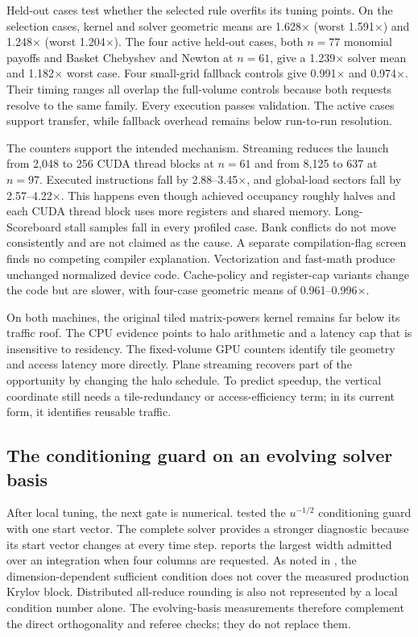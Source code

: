 Held-out cases test whether the selected rule overfits its tuning points. On the selection cases, kernel and solver geometric means are 1.628$\times$ (worst 1.591$\times$) and 1.248$\times$ (worst 1.204$\times$). The four active held-out cases, both $n=77$ monomial payoffs and Basket Chebyshev and Newton at $n=61$, give a 1.239$\times$ solver mean and 1.182$\times$ worst case. Four small-grid fallback controls give 0.991$\times$ and 0.974$\times$. Their timing ranges all overlap the full-volume controls because both requests resolve to the same family. Every execution passes validation. The active cases support transfer, while fallback overhead remains below run-to-run resolution.

The counters support the intended mechanism. Streaming reduces the launch from 2{,}048 to 256 CUDA thread blocks at $n=61$ and from 8{,}125 to 637 at $n=97$. Executed instructions fall by 2.88--3.45$\times$, and global-load sectors fall by 2.57--4.22$\times$. This happens even though achieved occupancy roughly halves and each CUDA thread block uses more registers and shared memory. Long-Scoreboard stall samples fall in every profiled case. Bank conflicts do not move consistently and are not claimed as the cause. A separate compilation-flag screen finds no competing compiler explanation. Vectorization and fast-math produce unchanged normalized device code. Cache-policy and register-cap variants change the code but are slower, with four-case geometric means of 0.961--0.996$\times$.

On both machines, the original tiled matrix-powers kernel remains far below its traffic roof. The CPU evidence points to halo arithmetic and a latency cap that is insensitive to residency. The fixed-volume GPU counters identify tile geometry and access latency more directly. Plane streaming recovers part of the opportunity by changing the halo schedule. To predict speedup, the vertical coordinate still needs a tile-redundancy or access-efficiency term; in its current form, it identifies reusable traffic.

\subsection{The conditioning guard on an evolving solver basis}\label{sec:integrator-guard}

After local tuning, the next gate is numerical.  tested the $u^{-1/2}$ conditioning guard with one start vector. The complete solver provides a stronger diagnostic because its start vector changes at every time step.  reports the largest width admitted over an integration when four columns are requested. As noted in , the dimension-dependent sufficient condition does not cover the measured production Krylov block. Distributed all-reduce rounding is also not represented by a local condition number alone. The evolving-basis measurements therefore complement the direct orthogonality and referee checks; they do not replace them.

